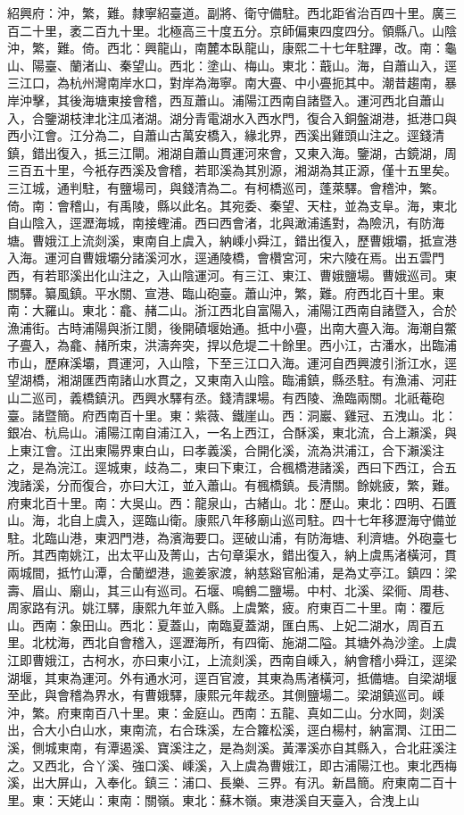 \begin{pinyinscope}
紹興府：沖，繁，難。隸寧紹臺道。副將、衛守備駐。西北距省治百四十里。廣三百二十里，袤二百九十里。北極高三十度五分。京師偏東四度四分。領縣八。山陰沖，繁，難。倚。西北：興龍山，南麓本臥龍山，康熙二十七年駐蹕，改。南：龜山、陽臺、蘭渚山、秦望山。西北：塗山、梅山。東北：蕺山。海，自蕭山入，逕三江口，為杭州灣南岸水口，對岸為海寧。南大亹、中小亹扼其中。潮昔趨南，暴岸沖擊，其後海塘東接會稽，西亙蕭山。浦陽江西南自諸暨入。運河西北自蕭山入，合鑒湖枝津北注瓜渚湖。湖分青電湖水入西水門，復合入銅盤湖港，抵港口與西小江會。江分為二，自蕭山古萬安橋入，緣北界，西溪出雞頭山注之。逕錢清鎮，錯出復入，抵三江閘。湘湖自蕭山貫運河來會，又東入海。鑒湖，古鏡湖，周三百五十里，今衹存西溪及會稽，若耶溪為其別源，湘湖為其正源，僅十五里矣。三江城，通判駐，有鹽場司，與錢清為二。有柯橋巡司，蓬萊驛。會稽沖，繁。倚。南：會稽山，有禹陵，縣以此名。其宛委、秦望、天柱，並為支阜。海，東北自山陰入，逕瀝海城，南接蟶浦。西曰西會渚，北與澉浦遙對，為險汛，有防海塘。曹娥江上流剡溪，東南自上虞入，納嵊小舜江，錯出復入，歷曹娥壩，抵宣港入海。運河自曹娥壩分諸溪河水，逕通陵橋，會欑宮河，宋六陵在焉。出五雲門西，有若耶溪出化山注之，入山陰運河。有三江、東江、曹娥鹽場。曹娥巡司。東關驛。纂風鎮。平水關、宣港、臨山砲臺。蕭山沖，繁，難。府西北百十里。東南：大羅山。東北：龕、赭二山。浙江西北自富陽入，浦陽江西南自諸暨入，合於漁浦街。古時浦陽與浙江閡，後開磧堰始通。抵中小亹，出南大亹入海。海潮自鱉子亹入，為龕、赭所束，洪濤奔突，捍以危堤二十餘里。西小江，古潘水，出臨浦巿山，歷麻溪壩，貫運河，入山陰，下至三江口入海。運河自西興渡引浙江水，逕望湖橋，湘湖匯西南諸山水貫之，又東南入山陰。臨浦鎮，縣丞駐。有漁浦、河莊山二巡司，義橋鎮汛。西興水驛有丞。錢清課場。有西陵、漁臨兩關。北祇菴砲臺。諸暨簡。府西南百十里。東：紫薇、鐵崖山。西：洞巖、雞冠、五洩山。北：銀冶、杭烏山。浦陽江南自浦江入，一名上西江，合酥溪，東北流，合上瀨溪，與上東江會。江出東陽界東白山，曰孝義溪，合開化溪，流為洪浦江，合下瀨溪注之，是為浣江。逕城東，歧為二，東曰下東江，合楓橋港諸溪，西曰下西江，合五洩諸溪，分而復合，亦曰大江，並入蕭山。有楓橋鎮。長清關。餘姚疲，繁，難。府東北百十里。南：大吳山。西：龍泉山，古緒山。北：歷山。東北：四明、石匱山。海，北自上虞入，逕臨山衛。康熙八年移廟山巡司駐。四十七年移瀝海守備並駐。北臨山港，東泗門港，為濱海要口。逕破山浦，有防海塘、利濟塘。外砲臺七所。其西南姚江，出太平山及菁山，古句章渠水，錯出復入，納上虞馬渚橫河，貫兩城間，抵竹山潭，合蘭塑港，逾姜家渡，納慈谿官船浦，是為丈亭江。鎮四：梁壽、眉山、廟山，其三山有巡司。石堰、鳴鶴二鹽場。中村、北溪、梁衕、周巷、周家路有汛。姚江驛，康熙九年並入縣。上虞繁，疲。府東百二十里。南：覆卮山。西南：象田山。西北：夏蓋山，南臨夏蓋湖，匯白馬、上妃二湖水，周百五里。北枕海，西北自會稽入，逕瀝海所，有四衛、施湖二隘。其塘外為沙塗。上虞江即曹娥江，古柯水，亦曰東小江，上流剡溪，西南自嵊入，納會稽小舜江，逕梁湖堰，其東為運河。外有通水河，逕百官渡，其東為馬渚橫河，抵備塘。自梁湖堰至此，與會稽為界水，有曹娥驛，康熙元年裁丞。其側鹽場二。梁湖鎮巡司。嵊沖，繁。府東南百八十里。東：金庭山。西南：五龍、真如二山。分水岡，剡溪出，合大小白山水，東南流，右合珠溪，左合籮松溪，逕白楊村，納富潤、江田二溪，側城東南，有潭遏溪、寶溪注之，是為剡溪。黃澤溪亦自其縣入，合北莊溪注之。又西北，合丫溪、強口溪、嵊溪，入上虞為曹娥江，即古浦陽江也。東北西梅溪，出大屏山，入奉化。鎮三：浦口、長樂、三界。有汛。新昌簡。府東南二百十里。東：天姥山：東南：關嶺。東北：蘇木嶺。東港溪自天臺入，合洩上山
\end{pinyinscope}
